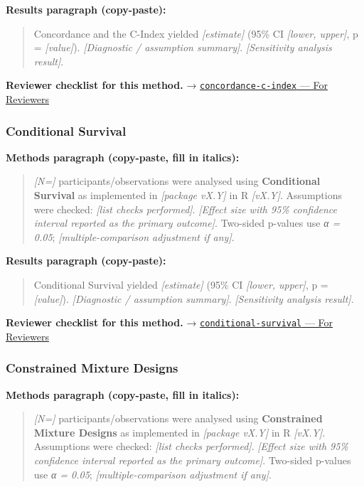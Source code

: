 \documentclass[
]{article}
\begin{document}
\textbf{Results paragraph (copy-paste):}

\begin{quote}
Concordance and the C-Index yielded \emph{{[}estimate{]}} (95\% CI
\emph{{[}lower, upper{]}}, p = \emph{{[}value{]}}). \emph{{[}Diagnostic
/ assumption summary{]}}. \emph{{[}Sensitivity analysis result{]}}.
\end{quote}

\textbf{Reviewer checklist for this method.} →
\href{../chapters/11-survival/concordance-c-index.Rmd\#for-reviewers}{\texttt{concordance-c-index}
--- For Reviewers}

\subsubsection{Conditional Survival}\label{conditional-survival}

\textbf{Methods paragraph (copy-paste, fill in italics):}

\begin{quote}
\emph{{[}N={]}} participants/observations were analysed using
\textbf{Conditional Survival} as implemented in \emph{{[}package
vX.Y{]}} in R \emph{{[}vX.Y{]}}. Assumptions were checked: \emph{{[}list
checks performed{]}}. \emph{{[}Effect size with 95\% confidence interval
reported as the primary outcome{]}}. Two-sided p-values use \emph{α =
0.05}; \emph{{[}multiple-comparison adjustment if any{]}}.
\end{quote}

\textbf{Results paragraph (copy-paste):}

\begin{quote}
Conditional Survival yielded \emph{{[}estimate{]}} (95\% CI
\emph{{[}lower, upper{]}}, p = \emph{{[}value{]}}). \emph{{[}Diagnostic
/ assumption summary{]}}. \emph{{[}Sensitivity analysis result{]}}.
\end{quote}

\textbf{Reviewer checklist for this method.} →
\href{../chapters/11-survival/conditional-survival.Rmd\#for-reviewers}{\texttt{conditional-survival}
--- For Reviewers}

\subsubsection{Constrained Mixture
Designs}\label{constrained-mixture-designs}

\textbf{Methods paragraph (copy-paste, fill in italics):}

\begin{quote}
\emph{{[}N={]}} participants/observations were analysed using
\textbf{Constrained Mixture Designs} as implemented in \emph{{[}package
vX.Y{]}} in R \emph{{[}vX.Y{]}}. Assumptions were checked: \emph{{[}list
checks performed{]}}. \emph{{[}Effect size with 95\% confidence interval
reported as the primary outcome{]}}. Two-sided p-values use \emph{α =
0.05}; \emph{{[}multiple-comparison adjustment if any{]}}.
\end{quote}
\end{document}
